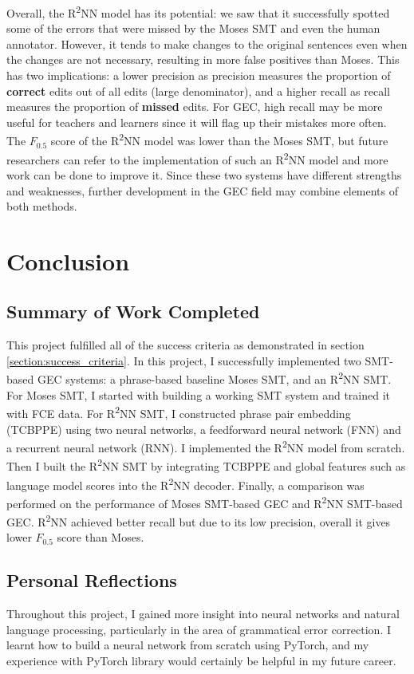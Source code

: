 \documentclass[12pt,a4paper,twoside,openright]{report}
\begin{document}
Overall, the R\textsuperscript{2}NN model has its potential: we saw that it successfully spotted some of the errors that were missed by the Moses SMT and even the human annotator. However, it tends to make changes to the original sentences even when the changes are not necessary, resulting in more false positives than Moses. This has two implications: a lower precision as precision measures the proportion of \textbf{correct} edits out of all edits (large denominator), and a higher recall as recall measures the proportion of \textbf{missed} edits. For GEC, high recall may be more useful for teachers and learners since it will flag up their mistakes more often. The $F_{0.5}$ score of the R\textsuperscript{2}NN model was lower than the Moses SMT, but future researchers can refer to the implementation of such an R\textsuperscript{2}NN model and more work can be done to improve it. Since these two systems have different strengths and weaknesses, further development in the GEC field may combine elements of both methods.

\chapter{Conclusion}

\section{Summary of Work Completed}
This project fulfilled all of the success criteria as demonstrated in section \ref{section:success_criteria}. In this project, I successfully implemented two SMT-based GEC systems: a phrase-based baseline Moses SMT, and an R\textsuperscript{2}NN SMT. For Moses SMT, I started with building a working SMT system and trained it with FCE data. For R\textsuperscript{2}NN SMT, I constructed phrase pair embedding (TCBPPE) using two neural networks, a feedforward neural network (FNN) and a recurrent neural network (RNN). I implemented the R\textsuperscript{2}NN model from scratch. Then I built the R\textsuperscript{2}NN SMT by integrating TCBPPE and global features such as language model scores into the R\textsuperscript{2}NN decoder. Finally, a comparison was performed on the performance of Moses SMT-based GEC and R\textsuperscript{2}NN SMT-based GEC. R\textsuperscript{2}NN achieved better recall but due to its low precision, overall it gives lower $F_{0.5}$ score than Moses. 

\section{Personal Reflections}
Throughout this project, I gained more insight into neural networks and natural language processing, particularly in the area of grammatical error correction. I learnt how to build a neural network from scratch using PyTorch, and my experience with PyTorch library would certainly be helpful in my future career. 
\end{document}
